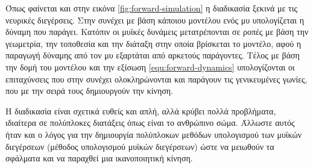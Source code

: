 Όπως φαίνεται και στην εικόνα \ref{fig:forward-simulation} η διαδικασία ξεκινά με τις νευρικές διεγέρσεις. Στην συνέχει με βάση κάποιου μοντέλου ενός μυ υπολογίζεται η δύναμη που παράγει. Κατόπιν οι μυϊκές δυνάμεις μετατρέπονται σε ροπές με βάση την γεωμετρία, την τοποθεσία και την διάταξη στην οποία βρίσκεται το μοντέλο, αφού η παραγωγή δύναμης από τον μυ εξαρτάται από αρκετούς παράγοντες. Τέλος με βάση την δομή του μοντέλου και την εξίσωση \ref{equ:forward-dynamics} υπολογίζονται οι επιταχύνσεις που στην συνέχει ολοκληρώνονται και παράγουν τις γενικευμένες γωνίες, που με την σειρά τους δημιουργούν την κίνηση.

Η διαδικασία είναι σχετικά ευθείς και απλή, αλλά κρύβει πολλά προβλήματα, ιδιαίτερα σε πολύπλοκες διατάξεις όπως είναι το ανθρώπινο σώμα. Άλλωστε αυτός ήταν και ο λόγος για την δημιουργία πολύπλοκων μεθόδων υπολογισμού των μυϊκών διεγέρσεων (μέθοδος υπολογισμού μυϊκών διεγέρσεων) ώστε να μειωθούν τα σφάλματα και να παραχθεί μια ικανοποιητική κίνηση.
